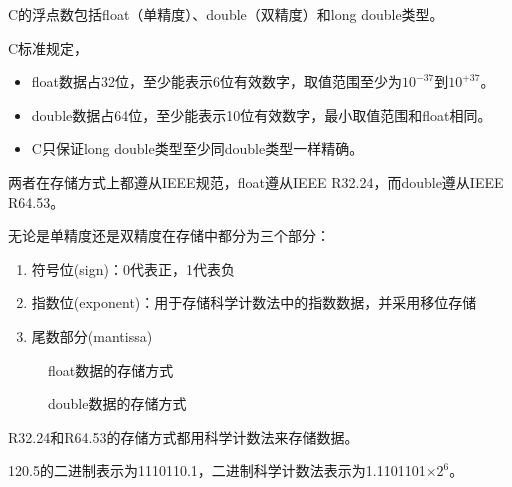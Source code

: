 \begin{frame}
C的浮点数包括float（单精度）、double（双精度）和long double类型。 
\end{frame}
%
%
\begin{frame}

C标准规定，
\begin{itemize}
\item float数据占32位，至少能表示6位有效数字，取值范围至少为$10^{-37}$到$10^{+37}$。
\item double数据占64位，至少能表示10位有效数字，最小取值范围和float相同。
\item C只保证long double类型至少同double类型一样精确。
\end{itemize}
\vspace{0.1in}

两者在存储方式上都遵从IEEE规范，float遵从IEEE R32.24，而double遵从IEEE R64.53。
\end{frame}
%
\begin{frame}
无论是单精度还是双精度在存储中都分为三个部分：

\begin{enumerate}
\item
符号位(sign)：0代表正，1代表负\\[0.1in]
\item 
指数位(exponent)：用于存储科学计数法中的指数数据，并采用移位存储\\[0.1in]
\item 
尾数部分(mantissa)
\end{enumerate}
\end{frame}
%
\begin{frame}
\begin{figure}
\centering

\caption{float数据的存储方式}
\end{figure}
\end{frame}
%
\begin{frame}
\begin{figure}
\centering

\caption{double数据的存储方式}
\end{figure}
\end{frame}
%
\begin{frame}
R32.24和R64.53的存储方式都用科学计数法来存储数据。

\begin{li}
120.5的二进制表示为1110110.1，二进制科学计数法表示为1.1101101$\times 2^6$。
\end{li}

\end{frame}
